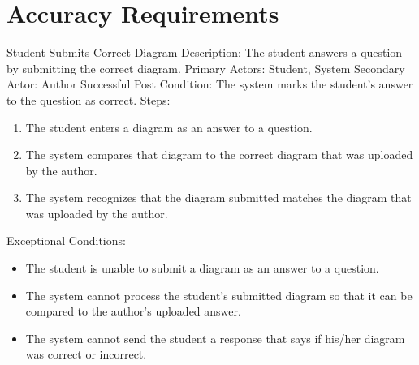 
\chapter{Accuracy Requirements}

    \begin{section}{Student Submits Correct Diagram}
        Description: The student answers a question by submitting the correct diagram. \newline
        Primary Actors: Student, System \newline
        Secondary Actor: Author \newline
        Successful Post Condition: The system marks the student's answer to the question as correct. \newline
        Steps:
        \begin{enumerate}
            \item{The student enters a diagram as an answer to a question.}
            \item{The system compares that diagram to the correct diagram that was uploaded by the author.}
            \item{The system recognizes that the diagram submitted matches the diagram that was uploaded by the author.}
        \end{enumerate}
        Exceptional Conditions:
        \begin{itemize}
            \item{The student is unable to submit a diagram as an answer to a question.}
            \item{The system cannot process the student's submitted diagram so that it can be compared to the author's uploaded answer.}
            \item{The system cannot send the student a response that says if his/her diagram was correct or incorrect.}
        \end{itemize}
    \end{section}

